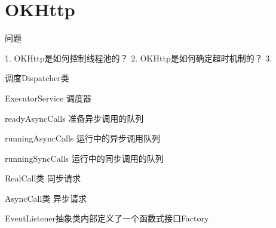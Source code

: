 \chapter{OKHttp}
\label{chap:okhttp}

问题

1. OKHttp是如何控制线程池的？
2. OKHttp是如何确定超时机制的？
3. 


调度Dispatcher类

ExecutorService 调度器

readyAsyncCalls 准备异步调用的队列

runningAsyncCalls 运行中的异步调用队列

runningSyncCalls 运行中的同步调用的队列


RealCall类  同步请求

AsyncCall类 异步请求



EventListener抽象类内部定义了一个函数式接口Factory
